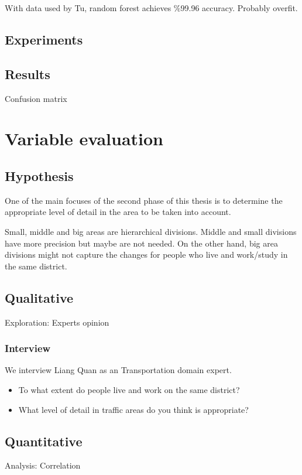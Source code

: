 \documentclass{article}
\begin{document}
With data used by Tu\cite{tu2016impact}, random forest achieves \%99.96 accuracy. Probably overfit.

\subsection{Experiments}

\subsection{Results}
Confusion matrix


\newpage
\section{Variable evaluation}
\label{sec:partII}
\subsection{Hypothesis}
One of the main focuses of the second phase of this thesis is to determine the appropriate level of detail in the area to be taken into account. 

Small, middle and big areas are hierarchical divisions. Middle and small divisions have more precision but maybe are not needed. On the other hand, big area divisions might not capture the changes for people who live and work/study in the same district. 

\subsection{Qualitative}
Exploration: Experts opinion

\subsubsection{Interview}
We interview Liang Quan as an Transportation domain expert. 

\begin{itemize}
\item To what extent do people live and work on the same district?
\item What level of detail in traffic areas do you think is appropriate?
\end{itemize}

\subsection{Quantitative}
Analysis: Correlation
\end{document}
